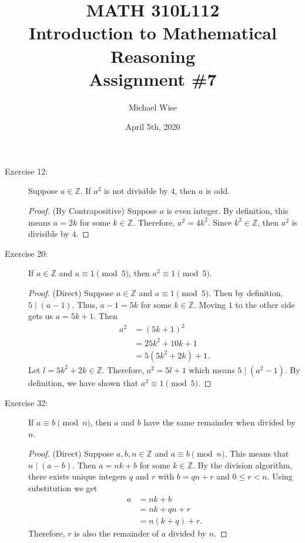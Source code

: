 \documentclass[12pt]{article}
\title{MATH 310L112\\
       Introduction to Mathematical Reasoning\\
       Assignment \#7}
\author{Michael Wise}
\date{April 5th, 2020}
\begin{document}
\maketitle
\begin{description}

\item[Exercise 12:] Suppose $a \in \mathbb{Z}$. If $a^2$ is not divisible by $4$, then $a$ is odd.

\begin{spacing}{2}
\begin{proof}
(By Contrapositive) Suppose $a$ is even integer. By definition, this means $a=2k$ for some $k \in \mathbb{Z}$. Therefore, $a^2 = 4k^2$. Since $k^2 \in \mathbb{Z}$, then $a^2$ is divisible by $4$.
\end{proof}
\end{spacing}
\item[Exercise 20:] If $a \in \mathbb{Z}$ and $a \equiv 1\pmod{5}$, then $a^2 \equiv 1\pmod{5}$.

\begin{spacing}{2}
\begin{proof}
(Direct) Suppose $a \in \mathbb{Z}$ and $a \equiv 1\pmod{5}$. Then by definition, $5 \mid (a - 1)$. Thus, $a-1=5k$ for some $k \in \mathbb{Z}$. Moving $1$ to the other side gets us $a = 5k + 1$. Then
\begin{align*}
a^2 &= (5k+1)^2 \\
&= 25k^2 + 10k + 1 \\
&= 5(5k^2 + 2k) + 1.
\end{align*}
Let $l = 5k^2 + 2k \in \mathbb{Z}.$ Therefore, $a^2 = 5l + 1$ which means $5 \mid (a^2 - 1)$. By definition, we have shown that $a^2 \equiv 1\pmod{5}$.
\end{proof}
\end{spacing} 

\item[Exercise 32:] If $a \equiv b\pmod{n}$, then $a$ and $b$ have the same remainder when divided by $n$.

\begin{spacing}{2}
\begin{proof}
(Direct) Suppose $a,b,n \in \mathbb{Z}$ and $a \equiv b\pmod{n}$. This means that $n \mid (a-b)$. Then $a = nk + b$ for some $k \in \mathbb{Z}$. By the division algorithm, there exists unique integers $q$ and $r$ with $b = qn +r$ and $0 \leq r < n$. Using substitution we get
\begin{align*}
a &= nk + b \\
&= nk + qn + r \\
&= n(k+q) + r.
\end{align*}
Therefore, $r$ is also the remainder of $a$ divided by $n$.
\end{proof}
\end{spacing} 

\end{description}
\end{document}
